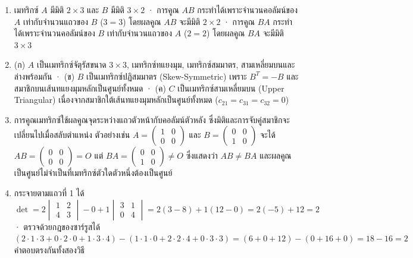 \begin{enumerate}
    \item เมทริกซ์ $A$ มีมิติ $2 \times 3$ และ $B$ มีมิติ $3 \times 2$ · การคูณ $AB$ กระทำได้เพราะจำนวนคอลัมน์ของ $A$ เท่ากับจำนวนแถวของ $B$ ($3 = 3$) โดยผลคูณ $AB$ จะมีมิติ $2 \times 2$ · การคูณ $BA$ กระทำได้เพราะจำนวนคอลัมน์ของ $B$ เท่ากับจำนวนแถวของ $A$ ($2 = 2$) โดยผลคูณ $BA$ จะมีมิติ $3 \times 3$

    \item (ก) $A$ เป็นเมทริกซ์จัตุรัสขนาด $3 \times 3$, เมทริกซ์ทแยงมุม, เมทริกซ์สมมาตร, สามเหลี่ยมบนและล่างพร้อมกัน · (ข) $B$ เป็นเมทริกซ์ปฏิสมมาตร (Skew-Symmetric) เพราะ $B^T = -B$ และสมาชิกบนเส้นทแยงมุมหลักเป็นศูนย์ทั้งหมด · (ค) $C$ เป็นเมทริกซ์สามเหลี่ยมบน (Upper Triangular) เนื่องจากสมาชิกใต้เส้นทแยงมุมหลักเป็นศูนย์ทั้งหมด ($c_{21} = c_{31} = c_{32} = 0$)

    \item การคูณเมทริกซ์ใช้ผลคูณจุดระหว่างแถวตัวหน้ากับคอลัมน์ตัวหลัง ซึ่งมิติและการจับคู่สมาชิกจะเปลี่ยนไปเมื่อสลับตำแหน่ง ตัวอย่างเช่น $A = \begin{pmatrix} 1 & 0 \\ 0 & 0 \end{pmatrix}$ และ $B = \begin{pmatrix} 0 & 0 \\ 1 & 0 \end{pmatrix}$ จะได้ $AB = \begin{pmatrix} 0 & 0 \\ 0 & 0 \end{pmatrix} = O$ แต่ $BA = \begin{pmatrix} 0 & 0 \\ 1 & 0 \end{pmatrix} \neq O$ ซึ่งแสดงว่า $AB \neq BA$ และผลคูณเป็นศูนย์ไม่จำเป็นที่เมทริกซ์ตัวใดตัวหนึ่งต้องเป็นศูนย์

    \item กระจายตามแถวที่ 1 ได้ $\det = 2 \begin{vmatrix} 1 & 2 \\ 4 & 3 \end{vmatrix} - 0 + 1 \begin{vmatrix} 3 & 1 \\ 0 & 4 \end{vmatrix} = 2(3-8) + 1(12-0) = 2(-5) + 12 = 2$ · ตรวจด้วยกฎของซาร์รูสได้ $(2\cdot1\cdot3 + 0\cdot2\cdot0 + 1\cdot3\cdot4) - (1\cdot1\cdot0 + 2\cdot2\cdot4 + 0\cdot3\cdot3) = (6 + 0 + 12) - (0 + 16 + 0) = 18 - 16 = 2$ คำตอบตรงกันทั้งสองวิธี


\end{enumerate}
